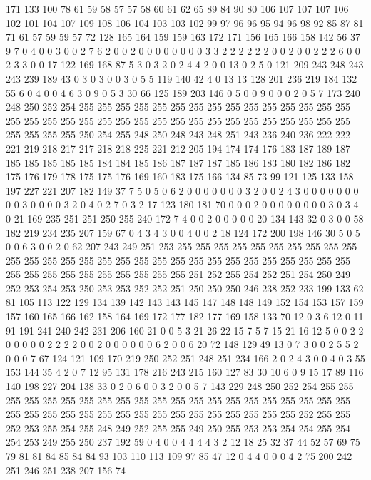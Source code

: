 171 133 100 78 61 59 58 57 57 58 60 61 62 65 89 84 90 80 106 107
107 107 106 102 101 104 107 109 108 106 104 103 103 102 99 97 96 96 95 94
96 98 92 85 87 81 71 61 57 59 59 57 72 128 165 164 159 159 163 172
171 156 165 166 158 142 56 37 9 7 0 4 0 0 3 0 0 2 7 6
2 0 0 2 0 0 0 0 0 0 0 0 3 3 2 2 2 2 2 2
0 0 2 0 0 2 2 2 6 0 0 2 3 3 0 0 17 122 169 168
87 5 3 0 3 2 0 2 4 4 2 0 0 13 0 2 5 0 121 209
243 248 243 243 239 189 43 0 3 0 3 0 0 3 0 5 5 119 140 42
4 0 13 13 128 201 236 219 184 132 55 6 0 4 0 0 4 6 3 0
9 0 5 3 30 66 125 189 203 146 0 5 0 0 9 0 0 0 2 0
5 7 173 240 248 250 252 254 255 255 255 255 255 255 255 255 255 255 255 255
255 255 255 255 255 255 255 255 255 255 255 255 255 255 255 255 255 255 255 255
255 255 255 255 255 255 250 254 255 248 250 248 243 248 251 243 236 240 236 222
222 221 219 218 217 217 218 218 225 221 212 205 194 174 174 176 183 187 189 187
185 185 185 185 185 184 184 185 186 187 187 187 185 186 183 180 182 186 182 175
176 179 178 175 175 176 169 160 183 175 166 134 85 73 99 121 125 133 158 197
227 221 207 182 149 37 7 5 0 5 0 6 2 0 0 0 0 0 0 0
3 2 0 0 2 4 3 0 0 0 0 0 0 0 0 0 3 0 0 0
0 3 2 0 4 0 2 7 0 3 2 17 123 180 181 70 0 0 0 2
0 0 0 0 0 0 0 0 3 0 3 4 0 21 169 235 251 251 250 255
240 172 7 4 0 0 2 0 0 0 0 0 20 134 143 32 0 3 0 0
58 182 219 234 235 207 159 67 0 4 3 4 3 0 0 4 0 0 2 18
124 172 200 198 146 30 5 0 5 0 0 6 3 0 0 2 0 62 207 243
249 251 253 255 255 255 255 255 255 255 255 255 255 255 255 255 255 255 255 255
255 255 255 255 255 255 255 255 255 255 255 255 255 255 255 255 255 255 255 255
255 255 251 252 255 254 252 251 254 250 249 252 253 254 253 250 253 253 252 252
251 250 250 250 246 238 252 233 199 133 62 81 105 113 122 129 134 139 142 143
143 145 147 148 148 149 152 154 153 157 159 157 160 165 166 162 158 164 169 172
177 182 177 169 158 133 70 12 0 3 6 12 0 11 91 191 241 240 242 231
206 160 21 0 0 5 3 21 26 22 15 7 5 7 15 21 16 12 5 0
0 2 2 0 0 0 0 0 2 2 2 2 0 0 2 0 0 0 0 0
0 6 2 0 0 6 20 72 148 129 49 13 0 7 3 0 0 2 5 5
2 0 0 0 7 67 124 121 109 170 219 250 252 251 248 251 234 166 2 0
2 4 3 0 0 4 0 3 55 153 144 35 4 2 0 7 12 95 131 178
216 243 215 160 127 83 30 10 6 0 9 15 17 89 116 140 198 227 204 138
33 0 2 0 6 0 0 3 2 0 0 5 7 143 229 248 250 252 254 255
255 255 255 255 255 255 255 255 255 255 255 255 255 255 255 255 255 255 255 255
255 255 255 255 255 255 255 255 255 255 255 255 255 255 255 255 252 255 255 252
253 255 254 255 248 249 252 255 255 249 250 255 253 253 254 254 255 254 254 253
249 255 250 237 192 59 0 4 0 0 4 4 4 4 3 2 12 18 25 32
37 44 52 57 69 75 79 81 81 84 85 84 84 93 103 110 113 109 97 85
47 12 0 4 4 0 0 0 4 2 75 200 242 251 246 251 238 207 156 74
